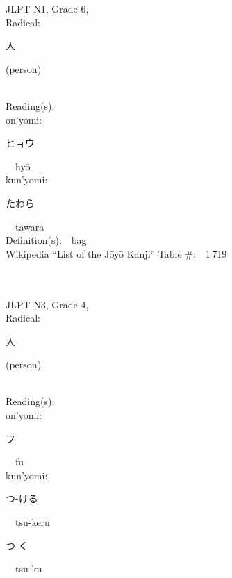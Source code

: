 \begin{multicols}{2}
{JLPT N1, Grade 6, \\Radical:\ \ {\begin{CJK}{UTF8}{min} 人 \end{CJK}} (person) } \\
Reading(s):\ \ \\
{\hspace*{1em}}on'yomi:\ \ \\
{\hspace*{2em}}{\begin{CJK}{UTF8}{min} ヒョウ \end{CJK}}\ \ hy\=o\ \ \\
{\hspace*{1em}}kun'yomi:\ \ \\
{\hspace*{2em}}{\begin{CJK}{UTF8}{min} たわら \end{CJK}}\ \ tawara\ \ \\
Definition(s):\ \ bag \\
Wikipedia ``List of the J\=oy\=o Kanji'' Table \#:\ \ 1\,719 \\
\ \ \\
{\fontsize{34pt}{40pt}  }\ \ \\  %
{JLPT N3, Grade 4, \\Radical:\ \ {\begin{CJK}{UTF8}{min} 人 \end{CJK}} (person) } \\
Reading(s):\ \ \\
{\hspace*{1em}}on'yomi:\ \ \\
{\hspace*{2em}}{\begin{CJK}{UTF8}{min} フ \end{CJK}}\ \ fu\ \ \\
{\hspace*{1em}}kun'yomi:\ \ \\
{\hspace*{2em}}{\begin{CJK}{UTF8}{min} つ-ける \end{CJK}}\ \ tsu-keru\ \ \\
{\hspace*{2em}}{\begin{CJK}{UTF8}{min} つ-く \end{CJK}}\ \ tsu-ku\ \ \\

\end{multicols}
